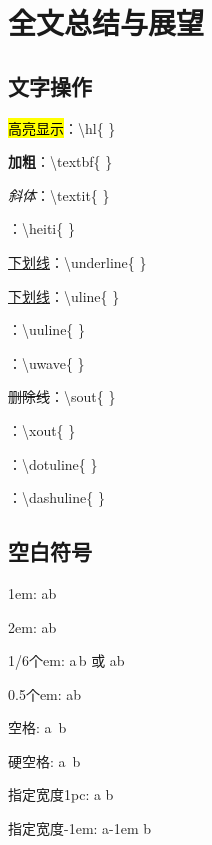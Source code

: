 
\chapter{全文总结与展望}\label{ch:6}

\section{文字操作}

\hl{高亮显示}：\textbackslash hl\{ \}

\textbf{加粗}：\textbackslash textbf\{ \}

\textit{斜体}：\textbackslash textit\{ \}

：\textbackslash heiti\{ \}

\underline{下划线}：\textbackslash underline\{ \}

\uline{下划线}：\textbackslash uline\{ \}

：\textbackslash uuline\{ \}

：\textbackslash uwave\{ \}

\sout{删除线}：\textbackslash sout\{ \}

：\textbackslash xout\{ \}

：\textbackslash dotuline\{ \}

：\textbackslash dashuline\{ \}


\section{空白符号}
 
    1em: a\quad b
 
    2em: a\qquad b
 
    1/6个em: a\,b 或 a\thinspace b
 
    0.5个em: a\enspace b
 
    空格: a\ b
 
    硬空格: a~b
 
    指定宽度1pc: a\kern 1pc b
 
    指定宽度-1em: a\kern -1em b
 
